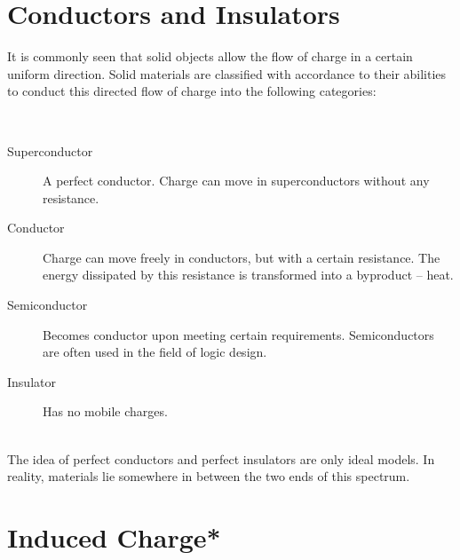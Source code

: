 \section{Conductors and Insulators}
It is commonly seen that solid objects allow the flow of charge in a certain uniform direction. Solid materials are classified with accordance to their abilities to conduct this directed flow of charge into the following categories:
\begin{definition}
    \ \begin{description}
        \item[Superconductor] A perfect conductor. Charge can move in superconductors without any resistance.
        \item[Conductor] Charge can move freely in conductors, but with a certain resistance. The energy dissipated by this resistance is transformed into a byproduct -- heat.
        \item[Semiconductor] Becomes conductor upon meeting certain requirements. Semiconductors are often used in the field of logic design.
        \item[Insulator] Has no mobile charges.
    \end{description}
\end{definition}
\vspace{-12pt}
\begin{remark}
    \ \\The idea of perfect conductors and perfect insulators are only ideal models. In reality, materials lie somewhere in between the two ends of this spectrum.
\end{remark}
\section{Induced Charge*}
